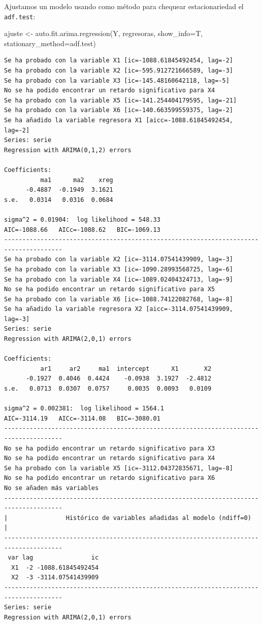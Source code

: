 \documentclass[
  12pt,
  a4paper]{article}
\newenvironment{Shaded}{\begin{snugshade}}{\end{snugshade}}
\newcommand{\AttributeTok}[1]{\textcolor[rgb]{0.77,0.63,0.00}{#1}}
\newcommand{\FunctionTok}[1]{\textcolor[rgb]{0.00,0.00,0.00}{#1}}
\newcommand{\NormalTok}[1]{#1}
\newcommand{\OtherTok}[1]{\textcolor[rgb]{0.56,0.35,0.01}{#1}}
\newcommand{\StringTok}[1]{\textcolor[rgb]{0.31,0.60,0.02}{#1}}
\begin{document}
Ajustamos un modelo usando como método para chequear estacionariedad el
\texttt{adf.test}:

\begin{Shaded}
\begin{Highlighting}[]
\NormalTok{ajuste }\OtherTok{\textless{}{-}} \FunctionTok{auto.fit.arima.regression}\NormalTok{(Y, regresoras, }\AttributeTok{show\_info=}\NormalTok{T,}
                                    \AttributeTok{stationary\_method=}\StringTok{\textquotesingle{}adf.test\textquotesingle{}}\NormalTok{)}
\end{Highlighting}
\end{Shaded}

\begin{verbatim}
Se ha probado con la variable X1 [ic=-1088.61845492454, lag=-2]
Se ha probado con la variable X2 [ic=-595.912721666589, lag=-3]
Se ha probado con la variable X3 [ic=-145.48160642118, lag=-5]
No se ha podido encontrar un retardo significativo para X4
Se ha probado con la variable X5 [ic=-141.254404179595, lag=-21]
Se ha probado con la variable X6 [ic=-140.663599559375, lag=-2]
Se ha añadido la variable regresora X1 [aicc=-1088.61845492454, lag=-2]
Series: serie 
Regression with ARIMA(0,1,2) errors 

Coefficients:
          ma1      ma2    xreg
      -0.4887  -0.1949  3.1621
s.e.   0.0314   0.0316  0.0684

sigma^2 = 0.01904:  log likelihood = 548.33
AIC=-1088.66   AICc=-1088.62   BIC=-1069.13
--------------------------------------------------------------------------------------
Se ha probado con la variable X2 [ic=-3114.07541439909, lag=-3]
Se ha probado con la variable X3 [ic=-1090.28993568725, lag=-6]
Se ha probado con la variable X4 [ic=-1089.02404324713, lag=-9]
No se ha podido encontrar un retardo significativo para X5
Se ha probado con la variable X6 [ic=-1088.74122082768, lag=-8]
Se ha añadido la variable regresora X2 [aicc=-3114.07541439909, lag=-3]
Series: serie 
Regression with ARIMA(2,0,1) errors 

Coefficients:
          ar1     ar2     ma1  intercept      X1       X2
      -0.1927  0.4046  0.4424    -0.0938  3.1927  -2.4812
s.e.   0.0713  0.0307  0.0757     0.0035  0.0093   0.0109

sigma^2 = 0.002381:  log likelihood = 1564.1
AIC=-3114.19   AICc=-3114.08   BIC=-3080.01
--------------------------------------------------------------------------------------
No se ha podido encontrar un retardo significativo para X3
No se ha podido encontrar un retardo significativo para X4
Se ha probado con la variable X5 [ic=-3112.04372835671, lag=-8]
No se ha podido encontrar un retardo significativo para X6
No se añaden más variables
--------------------------------------------------------------------------------------
|                Histórico de variables añadidas al modelo (ndiff=0)                 |
--------------------------------------------------------------------------------------
 var lag                ic
  X1  -2 -1088.61845492454
  X2  -3 -3114.07541439909
--------------------------------------------------------------------------------------
Series: serie 
Regression with ARIMA(2,0,1) errors 


\end{verbatim}
\end{document}
